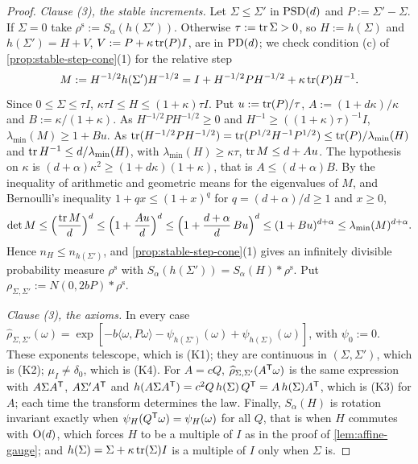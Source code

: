 \begin{proof}
\emph{Clause (3), the stable increments.} Let $\Sigma \le \Sigma'$ in $\mathrm{PSD}(d)$ and $P := \Sigma' -
\Sigma$. If $\Sigma = 0$ take $\rho^{\mathrm s} := S_\alpha(h(\Sigma'))$. Otherwise $\tau := \operatorname{tr}\Sigma > 0$,
so $H := h(\Sigma)$ and $h(\Sigma') = H + V$, $V := P + \kappa\operatorname{tr}(P)I$, are in $\mathrm{PD}(d)$; we check
condition (c) of \ref{prop:stable-step-cone}(1) for the relative step
\[
  M := H^{-1/2}h(\Sigma')H^{-1/2} = I + H^{-1/2}PH^{-1/2} + \kappa\operatorname{tr}(P)H^{-1} .
\]
Since $0 \le \Sigma \le \tau I$, $\kappa\tau I \le H \le (1+\kappa)\tau I$. Put $u := \operatorname{tr}(P)/\tau$,
$A := (1+d\kappa)/\kappa$ and $B := \kappa/(1+\kappa)$. As $H^{-1/2}PH^{-1/2} \ge 0$ and
$H^{-1} \ge ((1+\kappa)\tau)^{-1}I$, $\lambda_{\min}(M) \ge 1 + Bu$. As
$\operatorname{tr}(H^{-1/2}PH^{-1/2}) = \operatorname{tr}(P^{1/2}H^{-1}P^{1/2}) \le \operatorname{tr}(P)/\lambda_{\min}(H)$ and
$\operatorname{tr} H^{-1} \le d/\lambda_{\min}(H)$, with $\lambda_{\min}(H) \ge \kappa\tau$, $\operatorname{tr} M \le d + Au$. The
hypothesis on $\kappa$ is $(d+\alpha)\kappa^2 \ge (1+d\kappa)(1+\kappa)$, that is $A \le (d+\alpha)B$.
By the inequality of arithmetic and geometric means for the eigenvalues of $M$, and Bernoulli's
inequality $1 + qx \le (1+x)^q$ for $q = (d+\alpha)/d \ge 1$ and $x \ge 0$,
\[
  \det M \le \Bigl(\frac{\operatorname{tr} M}{d}\Bigr)^d \le \Bigl(1 + \frac{Au}{d}\Bigr)^d
  \le \Bigl(1 + \frac{d+\alpha}{d}\,Bu\Bigr)^d \le (1 + Bu)^{d+\alpha} \le \lambda_{\min}(M)^{d+\alpha} .
\]
Hence $n_H \le n_{h(\Sigma')}$, and \ref{prop:stable-step-cone}(1) gives an infinitely divisible
probability measure $\rho^{\mathrm s}$ with $S_\alpha(h(\Sigma')) = S_\alpha(H) * \rho^{\mathrm s}$. Put
$\rho_{\Sigma,\Sigma'} := N(0,2bP) * \rho^{\mathrm s}$.

\emph{Clause (3), the axioms.} In every case $\widehat\rho_{\Sigma,\Sigma'}(\omega) =
\exp[-b\langle\omega,P\omega\rangle - \psi_{h(\Sigma')}(\omega) + \psi_{h(\Sigma)}(\omega)]$, with
$\psi_0 := 0$. These exponents telescope, which is (K1); they are continuous in $(\Sigma,\Sigma')$,
which is (K2); $\mu_I \ne \delta_0$, which is (K4). For $A = cQ$,
$\widehat\rho_{\Sigma,\Sigma'}(A^{\mathsf{T}}\omega)$ is the same expression with $A\Sigma A^{\mathsf{T}}$,
$A\Sigma'A^{\mathsf{T}}$ and $h(A\Sigma A^{\mathsf{T}}) = c^2Q\,h(\Sigma)\,Q^{\mathsf{T}} = A\,h(\Sigma)A^{\mathsf{T}}$, which is (K3)
for $A$; each time the transform determines the law. Finally, $S_\alpha(H)$ is rotation invariant
exactly when $\psi_H(Q^{\mathsf{T}}\omega) = \psi_H(\omega)$ for all $Q$, that is when $H$ commutes with
$\mathrm{O}(d)$, which forces $H$ to be a multiple of $I$ as in the proof of \ref{lem:affine-gauge}; and
$h(\Sigma) = \Sigma + \kappa\operatorname{tr}(\Sigma)I$ is a multiple of $I$ only when $\Sigma$ is.
\end{proof}

